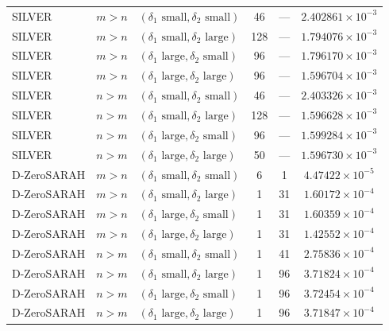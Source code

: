 \documentclass{article}
\theoremstyle{plain}
\newcommand{\algname}[1]{{\sf\scalefont{0.88}\color{mydarkgreen}#1}\xspace}
\def\algname#1{#1}%
\begin{document}
\begin{longtable}{lllccc}
\midrule
\algname{SILVER} & $m>n$ & $(\delta_1 \text{ small}, \delta_2 \text{ small})$ & 46  & --- & $2.402861 \times 10^{-3}$ \\
\algname{SILVER} & $m>n$ & $(\delta_1 \text{ small}, \delta_2 \text{ large})$ & 128 & --- & $1.794076 \times 10^{-3}$ \\
\algname{SILVER} & $m>n$ & $(\delta_1 \text{ large}, \delta_2 \text{ small})$ & 96  & --- & $1.796170 \times 10^{-3}$ \\
\algname{SILVER} & $m>n$ & $(\delta_1 \text{ large}, \delta_2 \text{ large})$ & 96  & --- & $1.596704 \times 10^{-3}$ \\
\algname{SILVER} & $n>m$ & $(\delta_1 \text{ small}, \delta_2 \text{ small})$ & 46  & --- & $2.403326 \times 10^{-3}$ \\
\algname{SILVER} & $n>m$ & $(\delta_1 \text{ small}, \delta_2 \text{ large})$ & 128 & --- & $1.596628 \times 10^{-3}$ \\
\algname{SILVER} & $n>m$ & $(\delta_1 \text{ large}, \delta_2 \text{ small})$ & 96  & --- & $1.599284 \times 10^{-3}$ \\
\algname{SILVER} & $n>m$ & $(\delta_1 \text{ large}, \delta_2 \text{ large})$ & 50  & --- & $1.596730 \times 10^{-3}$ \\
\midrule
\algname{D-ZeroSARAH} & $m>n$ & $(\delta_1 \text{ small}, \delta_2 \text{ small})$ & 6 & 1  & $4.47422 \times 10^{-5}$ \\
\algname{D-ZeroSARAH} & $m>n$ & $(\delta_1 \text{ small}, \delta_2 \text{ large})$ & 1 & 31 & $1.60172 \times 10^{-4}$ \\
\algname{D-ZeroSARAH} & $m>n$ & $(\delta_1 \text{ large}, \delta_2 \text{ small})$ & 1 & 31 & $1.60359 \times 10^{-4}$ \\
\algname{D-ZeroSARAH} & $m>n$ & $(\delta_1 \text{ large}, \delta_2 \text{ large})$ & 1 & 31 & $1.42552 \times 10^{-4}$ \\
\algname{D-ZeroSARAH} & $n>m$ & $(\delta_1 \text{ small}, \delta_2 \text{ small})$ & 1 & 41 & $2.75836 \times 10^{-4}$ \\
\algname{D-ZeroSARAH} & $n>m$ & $(\delta_1 \text{ small}, \delta_2 \text{ large})$ & 1 & 96 & $3.71824 \times 10^{-4}$ \\
\algname{D-ZeroSARAH} & $n>m$ & $(\delta_1 \text{ large}, \delta_2 \text{ small})$ & 1 & 96 & $3.72454 \times 10^{-4}$ \\
\algname{D-ZeroSARAH} & $n>m$ & $(\delta_1 \text{ large}, \delta_2 \text{ large})$ & 1 & 96 & $3.71847 \times 10^{-4}$ \\
\end{longtable}
\end{document}
